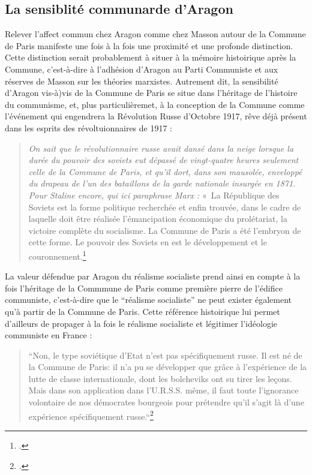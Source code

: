 \subsection{La sensiblité communarde d'Aragon}

Relever l'affect commun chez Aragon comme chez Masson autour de la Commune de Paris manifeste une fois à la fois une proximité et une profonde distinction. Cette distinction serait probablement à situer à la mémoire histoirique après la Commune, c'est-à-dire à l'adhésion d'Aragon au Parti Communiste et aux réserves de Masson sur les théories marxistes. Autrement dit, la sensibilité d'Aragon vis-à)vis de la Commune de Paris se situe dans l'héritage de l'histoire du communisme, et, plus particulièremet, à la conception de la Commune comme l'événement qui engendrera la Révolution Russe d'Octobre 1917, rêve déjà présent dans les esprits des révoltuionnaires de 1917 : 

\begin{quote}
\emph{On sait que le révolutionnaire russe avait dansé dans la neige lorsque la durée du pouvoir des soviets eut dépassé de vingt-quatre heures seulement celle de la Commune de Paris, et qu’il dort, dans son mausolée, enveloppé du drapeau de l’un des bataillons de la garde nationale insurgée en 1871. Pour Staline encore, qui ici paraphrase Marx :} « La République des Soviets est la forme politique recherchée et enfin trouvée, dans le cadre de laquelle doit être réalisée l’émancipation économique du prolétariat, la victoire complète du  socialisme. La Commune de Paris a été l’embryon de cette forme. Le pouvoir des Soviets en est le développement et le couronnement.\footcite[p241]{proces}\end{quote}

La valeur défendue par Aragon du réalisme socialiste prend ainsi en compte à la fois l'héritage de la Commmune de Paris comme première pierre de l'édifice communiste, c'est-à-dire que le \enquote{réalisme socialiste} ne peut exister également qu'à partir de la Commune de Paris. Cette référence histoirique lui permet d'ailleurs de propager à la fois le réalisme socialiste et légitimer l'idéologie communiste en France : 

\begin{quote}
“Non, le type soviétique d’Etat n’est pas spécifiquement russe. Il est né de la Commune de Paris: il n’a pu se développer que grâce à l’expérience de la lutte de classe internationale, dont les bolcheviks ont su tirer les leçons. Mais dans son application dans l’U.R.S.S. même, il faut toute l’ignorance volontaire de nos démocrates bourgeois pour prétendre qu’il s’agit là d’une expérience spécifiquement russe.“\footcite[p121]{lavoinne}	
\end{quote}

